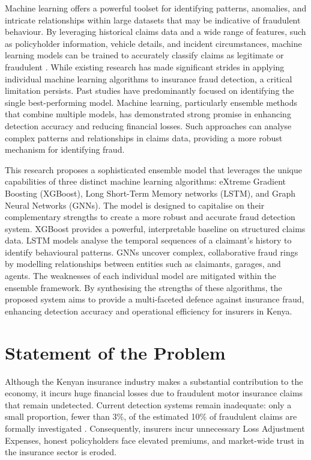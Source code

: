 \documentclass[12pt,a4paper,oneside]{report}
\numberwithin{equation}{chapter}
\begin{document}
Machine learning offers a powerful toolset for identifying patterns, anomalies, and intricate
relationships within large datasets that may be indicative of fraudulent behaviour. By leveraging
historical claims data and a wide range of features, such as policyholder information, vehicle
details, and incident circumstances, machine learning models can be trained to accurately classify
claims as legitimate or fraudulent \cite{zhang2024fraud}. While existing research has made
significant strides in applying individual machine learning algorithms to insurance fraud detection,
a critical limitation persists. Past studies have predominantly focused on identifying the single
best-performing model. Machine learning, particularly ensemble methods that combine multiple
models, has demonstrated strong promise in enhancing detection accuracy and reducing financial
losses. Such approaches can analyse complex patterns and relationships in claims data, providing
a more robust mechanism for identifying fraud.

This research proposes a sophisticated ensemble model that leverages the unique capabilities of
three distinct machine learning algorithms: eXtreme Gradient Boosting (XGBoost), Long
Short-Term Memory networks (LSTM), and Graph Neural Networks (GNNs). The model is designed
to capitalise on their complementary strengths to create a more robust and accurate fraud detection
system. XGBoost provides a powerful, interpretable baseline on structured claims data. LSTM
models analyse the temporal sequences of a claimant's history to identify behavioural patterns.
GNNs uncover complex, collaborative fraud rings by modelling relationships between entities such
as claimants, garages, and agents. The weaknesses of each individual model are mitigated within
the ensemble framework. By synthesising the strengths of these algorithms, the proposed system
aims to provide a multi-faceted defence against insurance fraud, enhancing detection accuracy and
operational efficiency for insurers in Kenya.

\section{Statement of the Problem}

Although the Kenyan insurance industry makes a substantial contribution to the economy, it incurs
huge financial losses due to fraudulent motor insurance claims that remain undetected. Current
detection systems remain inadequate: only a small proportion, fewer than 3\%, of the estimated
10\% of fraudulent claims are formally investigated \cite{kowshalya2018predicting}. Consequently,
insurers incur unnecessary Loss Adjustment Expenses, honest policyholders face elevated premiums,
and market-wide trust in the insurance sector is eroded.
\end{document}
